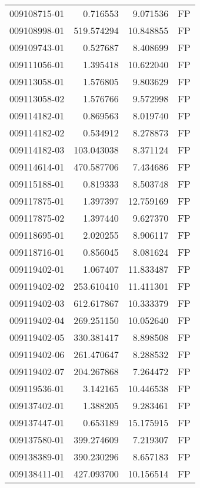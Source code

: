 \begin{tabular}{lrrl}
009108715-01 &    0.716553 &       9.071536 &   FP \\
009108998-01 &  519.574294 &      10.848855 &   FP \\
009109743-01 &    0.527687 &       8.408699 &   FP \\
009111056-01 &    1.395418 &      10.622040 &   FP \\
009113058-01 &    1.576805 &       9.803629 &   FP \\
009113058-02 &    1.576766 &       9.572998 &   FP \\
009114182-01 &    0.869563 &       8.019740 &   FP \\
009114182-02 &    0.534912 &       8.278873 &   FP \\
009114182-03 &  103.043038 &       8.371124 &   FP \\
009114614-01 &  470.587706 &       7.434686 &   FP \\
009115188-01 &    0.819333 &       8.503748 &   FP \\
009117875-01 &    1.397397 &      12.759169 &   FP \\
009117875-02 &    1.397440 &       9.627370 &   FP \\
009118695-01 &    2.020255 &       8.906117 &   FP \\
009118716-01 &    0.856045 &       8.081624 &   FP \\
009119402-01 &    1.067407 &      11.833487 &   FP \\
009119402-02 &  253.610410 &      11.411301 &   FP \\
009119402-03 &  612.617867 &      10.333379 &   FP \\
009119402-04 &  269.251150 &      10.052640 &   FP \\
009119402-05 &  330.381417 &       8.898508 &   FP \\
009119402-06 &  261.470647 &       8.288532 &   FP \\
009119402-07 &  204.267868 &       7.264472 &   FP \\
009119536-01 &    3.142165 &      10.446538 &   FP \\
009137402-01 &    1.388205 &       9.283461 &   FP \\
009137447-01 &    0.653189 &      15.175915 &   FP \\
009137580-01 &  399.274609 &       7.219307 &   FP \\
009138389-01 &  390.230296 &       8.657183 &   FP \\
009138411-01 &  427.093700 &      10.156514 &   FP \\

\end{tabular}
